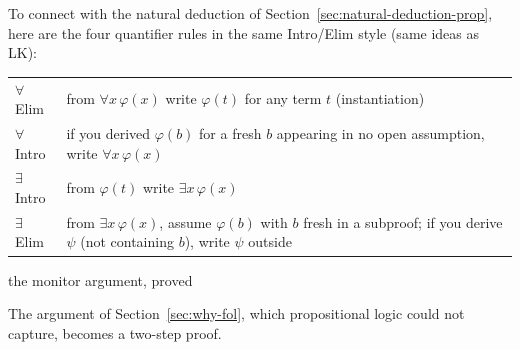 To connect with the natural deduction of Section~\ref{sec:natural-deduction-prop}, here are
the four quantifier rules in the same Intro/Elim style (same ideas as LK):
\begin{center}
\small
\renewcommand{\arraystretch}{1.3}
\begin{tabularx}{\linewidth}{@{}l X@{}}
\toprule
$\forall$\,Elim & from $\forall x\,\varphi(x)$ write $\varphi(t)$ for any term $t$ (instantiation) \\
$\forall$\,Intro & if you derived $\varphi(b)$ for a fresh $b$ appearing in no open
                   assumption, write $\forall x\,\varphi(x)$ \\
$\exists$\,Intro & from $\varphi(t)$ write $\exists x\,\varphi(x)$ \\
$\exists$\,Elim & from $\exists x\,\varphi(x)$, assume $\varphi(b)$ with $b$ fresh in a
                  subproof; if you derive $\psi$ (not containing $b$), write $\psi$ outside \\
\bottomrule
\end{tabularx}
\end{center}

\begin{nbexample}{the monitor argument, proved}
\begin{fitchproof}
 \RPrem
{} \RPrem
{} 
 
\end{fitchproof}
The argument of Section~\ref{sec:why-fol}, which propositional logic could not capture, becomes a two-step proof.
\end{nbexample}
